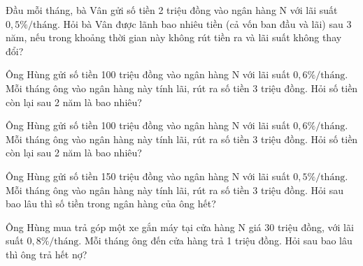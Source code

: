 %
\begin{vd}%
	Đầu mỗi tháng, bà Vân gửi số tiền 2 triệu đồng vào ngân hàng N với lãi suất $0,5\% / \mbox{tháng}$. Hỏi bà Vân được lãnh bao nhiêu tiền (cả vốn ban đầu và lãi) sau 3 năm, nếu trong khoảng thời gian này không rút tiền ra và lãi suất không thay đổi?
\end{vd}
%
\begin{vd}%
	Ông Hùng gửi số tiền 100 triệu đồng vào ngân hàng N với lãi suất $0,6\% / \mbox{tháng}$. Mỗi tháng ông vào ngân hàng này tính lãi, rút ra số tiền 3 triệu đồng. Hỏi số tiền còn lại sau 2 năm là bao nhiêu?
\end{vd}
%
\begin{vd}%
	Ông Hùng gửi số tiền 100 triệu đồng vào ngân hàng N với lãi suất $0,6\% / \mbox{tháng}$. Mỗi tháng ông vào ngân hàng này tính lãi, rút ra số tiền 3 triệu đồng. Hỏi số tiền còn lại sau 2 năm là bao nhiêu?
\end{vd}
%
\begin{vd}%
	Ông Hùng gửi số tiền 150 triệu đồng vào ngân hàng N với lãi suất $0,5\% / \mbox{tháng}$. Mỗi tháng ông vào ngân hàng này tính lãi, rút ra số tiền 3 triệu đồng. Hỏi sau bao lâu thì số tiền trong ngân hàng của ông hết?
\end{vd}
%
\begin{vd}%
	Ông Hùng mua trả góp một xe gắn máy tại cửa hàng N giá 30 triệu đồng, với lãi suất $0,8\% / \mbox{tháng}$. Mỗi tháng ông đến cửa hàng trả 1 triệu đồng. Hỏi sau bao lâu thì ông trả hết nợ?
\end{vd}
